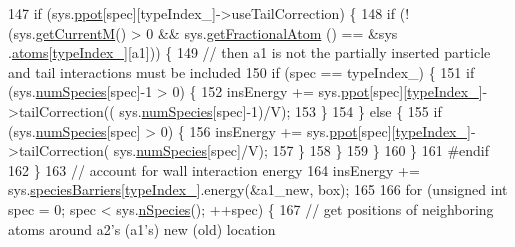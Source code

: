 \begin{DoxyCode}
147 \textcolor{preprocessor}{}            \textcolor{keywordflow}{if} (sys.\hyperlink{classsim_system_ad2e290b5963f132e6a3a56cee35c8e9f}{ppot}[spec][typeIndex\_]->useTailCorrection) \{
148                 \textcolor{keywordflow}{if} (!(sys.\hyperlink{classsim_system_a299fe4372e610b554eaaf5f5957b2dbc}{getCurrentM}() > 0 && sys.\hyperlink{classsim_system_a2ab77377c60e0e3109a6e875690b0ab7}{getFractionalAtom} () == &sys
      .\hyperlink{classsim_system_a90421b19082f7fb8fc23b7264b1161e4}{atoms}[\hyperlink{classmc_move_acb731965547b0326ef318ec96da8b46a}{typeIndex\_}][a1])) \{
149                     \textcolor{comment}{// then a1 is not the partially inserted particle and tail interactions must be
       included}
150                     \textcolor{keywordflow}{if} (spec == typeIndex\_) \{
151                                 \textcolor{keywordflow}{if} (sys.\hyperlink{classsim_system_a9eea865e6dc1cff377b1e79c4d9c23f0}{numSpecies}[spec]-1 > 0) \{
152                                     insEnergy += sys.\hyperlink{classsim_system_ad2e290b5963f132e6a3a56cee35c8e9f}{ppot}[spec][\hyperlink{classmc_move_acb731965547b0326ef318ec96da8b46a}{typeIndex\_}]->tailCorrection((
      sys.\hyperlink{classsim_system_a9eea865e6dc1cff377b1e79c4d9c23f0}{numSpecies}[spec]-1)/V);
153                             \}
154                     \} \textcolor{keywordflow}{else} \{
155                                 \textcolor{keywordflow}{if} (sys.\hyperlink{classsim_system_a9eea865e6dc1cff377b1e79c4d9c23f0}{numSpecies}[spec] > 0) \{
156                                     insEnergy += sys.\hyperlink{classsim_system_ad2e290b5963f132e6a3a56cee35c8e9f}{ppot}[spec][\hyperlink{classmc_move_acb731965547b0326ef318ec96da8b46a}{typeIndex\_}]->tailCorrection(
      sys.\hyperlink{classsim_system_a9eea865e6dc1cff377b1e79c4d9c23f0}{numSpecies}[spec]/V);
157                                 \}
158                     \}
159                 \}
160             \}
161 \textcolor{preprocessor}{#endif}
162 \textcolor{preprocessor}{}        \}
163         \textcolor{comment}{// account for wall interaction energy}
164         insEnergy += sys.\hyperlink{classsim_system_a5ae652ff4519f39c3862abae32a9581b}{speciesBarriers}[\hyperlink{classmc_move_acb731965547b0326ef318ec96da8b46a}{typeIndex\_}].energy(&a1\_new, box);
165 
166         \textcolor{keywordflow}{for} (\textcolor{keywordtype}{unsigned} \textcolor{keywordtype}{int} spec = 0; spec < sys.\hyperlink{classsim_system_ab5e2e9b6204de15520302fe1d51688dd}{nSpecies}(); ++spec) \{
167             \textcolor{comment}{// get positions of neighboring atoms around a2's (a1's) new (old) location}

\end{DoxyCode}
